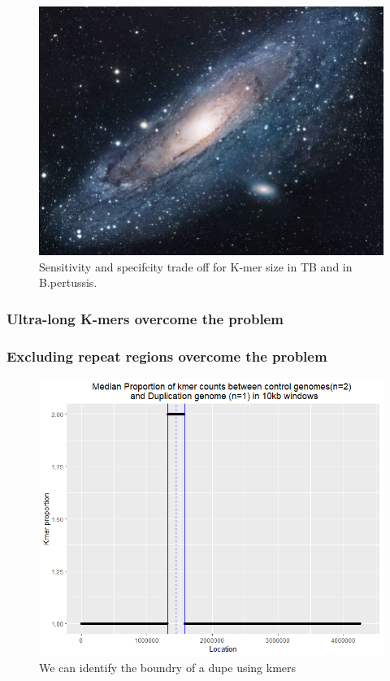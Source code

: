 \documentclass{article}
\begin{document}
\begin{figure}[h!]
\centering
\includegraphics[scale=1.7]{universe}
\caption{Sensitivity and specifcity trade off for K-mer size in TB and in B.pertussis.}
\label{fig:Sens_spec}
\end{figure}


\subsubsection{Ultra-long K-mers overcome the problem}


\subsubsection{Excluding repeat regions overcome the problem}




\begin{figure}[h!]
\centering
\includegraphics[scale=0.6]{Kmer_dupe.png}
\caption{We can identify the boundry of a dupe using kmers}
\label{fig:kmer_dupe1}
\end{figure}
\end{document}
